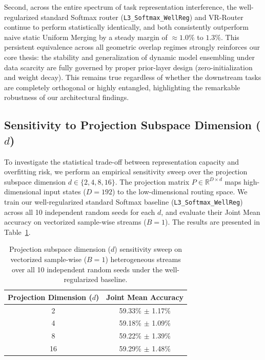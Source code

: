 Second, across the entire spectrum of task representation interference, the well-regularized standard Softmax router (\texttt{L3\_Softmax\_WellReg}) and VR-Router continue to perform statistically identically, and both consistently outperform naive static Uniform Merging by a steady margin of $\approx 1.0\%$ to $1.3\%$. This persistent equivalence across all geometric overlap regimes strongly reinforces our core thesis: the stability and generalization of dynamic model ensembling under data scarcity are fully governed by proper prior-layer design (zero-initialization and weight decay). This remains true regardless of whether the downstream tasks are completely orthogonal or highly entangled, highlighting the remarkable robustness of our architectural findings.

\subsection{Sensitivity to Projection Subspace Dimension ($d$)}
\label{subsec:projection_d_sweep}
To investigate the statistical trade-off between representation capacity and overfitting risk, we perform an empirical sensitivity sweep over the projection subspace dimension $d \in \{2, 4, 8, 16\}$. The projection matrix $P \in \mathbb{R}^{D \times d}$ maps high-dimensional input states ($D=192$) to the low-dimensional routing space. We train our well-regularized standard Softmax baseline (\texttt{L3\_Softmax\_WellReg}) across all 10 independent random seeds for each $d$, and evaluate their Joint Mean accuracy on vectorized sample-wise streams ($B=1$). The results are presented in Table~\ref{tab:projection_d_sweep}.

\begin{table}[h]
\caption{Projection subspace dimension ($d$) sensitivity sweep on vectorized sample-wise ($B=1$) heterogeneous streams over all 10 independent random seeds under the well-regularized baseline.}
\label{tab:projection_d_sweep}
\vskip 0.15in
\begin{center}
\begin{small}
\begin{sc}
\setlength{\tabcolsep}{8pt}
\begin{tabular}{cc}
\toprule
Projection Dimension ($d$) & Joint Mean Accuracy \\
\midrule
2 & 59.33\% $\pm$ 1.17\% \\
4 & 59.18\% $\pm$ 1.09\% \\
8 & 59.22\% $\pm$ 1.39\% \\
16 & 59.29\% $\pm$ 1.48\% \\
\bottomrule
\end{tabular}
\end{sc}
\end{small}
\end{center}
\vskip -0.1in
\end{table}

